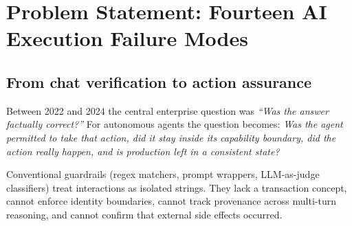 \documentclass[11pt,a4paper]{article}
\begin{document}
\section{Problem Statement: Fourteen AI Execution Failure Modes}

\subsection{From chat verification to action assurance}
Between 2022 and 2024 the central enterprise question was \emph{``Was the answer factually correct?''} For autonomous agents the question becomes: \emph{Was the agent permitted to take that action, did it stay inside its capability boundary, did the action really happen, and is production left in a consistent state?}

Conventional guardrails (regex matchers, prompt wrappers, LLM-as-judge classifiers) treat interactions as isolated strings. They lack a transaction concept, cannot enforce identity boundaries, cannot track provenance across multi-turn reasoning, and cannot confirm that external side effects occurred.
\end{document}
